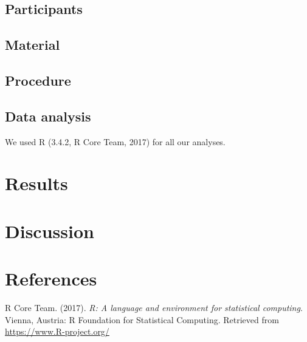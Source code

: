 \documentclass[english,man]{apa6}
\theoremstyle{definition}
\theoremstyle{definition}
\theoremstyle{definition}
\theoremstyle{remark}
\begin{document}
\subsection{Participants}\label{participants}

\subsection{Material}\label{material}

\subsection{Procedure}\label{procedure}

\subsection{Data analysis}\label{data-analysis}

We used R (3.4.2, R Core Team, 2017) for all our analyses.

\section{Results}\label{results}

\section{Discussion}\label{discussion}

\newpage

\section{References}\label{references}

\setlength{\parindent}{-0.5in} \setlength{\leftskip}{0.5in}

\hypertarget{refs}{}
\hypertarget{ref-R-base}{}
R Core Team. (2017). \emph{R: A language and environment for statistical
computing}. Vienna, Austria: R Foundation for Statistical Computing.
Retrieved from \url{https://www.R-project.org/}
\end{document}
